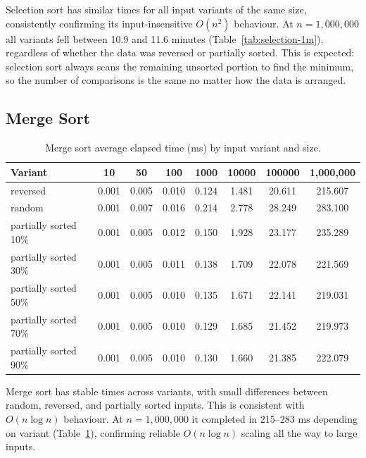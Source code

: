 \documentclass[11pt,a4paper]{article}
\begin{document}
Selection sort has similar times for all input variants of the same size, consistently confirming its input-insensitive \(O(n^2)\) behaviour. At \(n=1{,}000{,}000\) all variants fell between 10.9 and 11.6 minutes (Table~\ref{tab:selection-1m}), regardless of whether the data was reversed or partially sorted. This is expected: selection sort always scans the remaining unsorted portion to find the minimum, so the number of comparisons is the same no matter how the data is arranged.

\subsection{Merge Sort}
\begin{table}[H]
\centering
\footnotesize
\begin{tabular}{lccccccc}
\toprule
Variant & 10 & 50 & 100 & 1000 & 10000 & 100000 & 1{,}000{,}000 \\
\midrule
reversed & 0.001 & 0.005 & 0.010 & 0.124 & 1.481 & 20.611 & 215.607 \\
random & 0.001 & 0.007 & 0.016 & 0.214 & 2.778 & 28.249 & 283.100 \\
partially sorted 10\% & 0.001 & 0.005 & 0.012 & 0.150 & 1.928 & 23.177 & 235.289 \\
partially sorted 30\% & 0.001 & 0.005 & 0.011 & 0.138 & 1.709 & 22.078 & 221.569 \\
partially sorted 50\% & 0.001 & 0.005 & 0.010 & 0.135 & 1.671 & 22.141 & 219.031 \\
partially sorted 70\% & 0.001 & 0.005 & 0.010 & 0.129 & 1.685 & 21.452 & 219.973 \\
partially sorted 90\% & 0.001 & 0.005 & 0.010 & 0.130 & 1.660 & 21.385 & 222.079 \\
\bottomrule
\end{tabular}
\caption{Merge sort average elapsed time (ms) by input variant and size.}
\label{tab:merge-results}
\end{table}

Merge sort has stable times across variants, with small differences between random, reversed, and partially sorted inputs. This is consistent with \(O(n\log n)\) behaviour. At \(n=1{,}000{,}000\) it completed in 215--283 ms depending on variant (Table~\ref{tab:merge-results}), confirming reliable \(O(n\log n)\) scaling all the way to large inputs.
\end{document}
